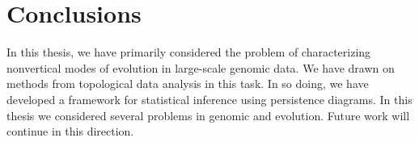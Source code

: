 
\chapter{Conclusions}
\label{ch:conclusions}

In this thesis, we have primarily considered the problem of characterizing nonvertical modes of evolution in large-scale genomic data.
We have drawn on methods from topological data analysis in this task.
In so doing, we have developed a framework for statistical inference using persistence diagrams.
In this thesis we considered several problems in genomic and evolution.
Future work will continue in this direction.